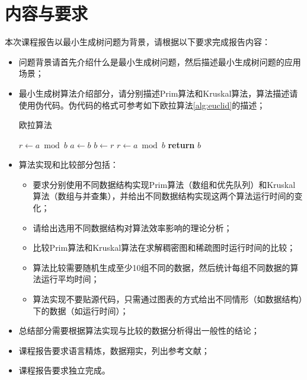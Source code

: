 \documentclass[a4paper,12pt]{ctexart}
\begin{document}
\maketitle
\newpage

\section{内容与要求}
本次课程报告以最小生成树问题为背景，请根据以下要求完成报告内容：
\begin{itemize}
    \item 问题背景请首先介绍什么是最小生成树问题，然后描述最小生成树问题的应用场景；
    \item 最小生成树算法介绍部分，请分别描述Prim算法和Kruskal算法，算法描述请使用伪代码。伪代码的格式可参考如下欧拉算法\ref{alg:euclid}的描述；
    \begin{algorithm}
        \caption{欧拉算法}\label{alg:euclid}
        \begin{algorithmic}[1]
        \State $r\gets a\bmod b$
        \State $a\gets b$
        \State $b\gets r$
        \State $r\gets a\bmod b$
        \EndWhile\label{euclidendwhile}
        \State \textbf{return} $b$
        \EndProcedure
        \end{algorithmic}
    \end{algorithm}
    \item 算法实现和比较部分包括：
    \begin{itemize}
        \item 要求分别使用不同数据结构实现Prim算法（数组和优先队列）和Kruskal算法（数组与并查集），并给出不同数据结构实现这两个算法运行时间的变化；
        \item 请给出选用不同数据结构对算法效率影响的理论分析；
        \item 比较Prim算法和Kruskal算法在求解稠密图和稀疏图时运行时间的比较；
        \item 算法比较需要随机生成至少10组不同的数据，然后统计每组不同数据的算法运行平均时间；
        \item 算法实现不要贴源代码，只需通过图表的方式给出不同情形（如数据结构）下的数据（如运行时间）；
    \end{itemize}
    \item 总结部分需要根据算法实现与比较的数据分析得出一般性的结论；
    \item 课程报告要求语言精炼，数据翔实，列出参考文献；
    \item 课程报告要求独立完成。
\end{itemize}
\end{document}
